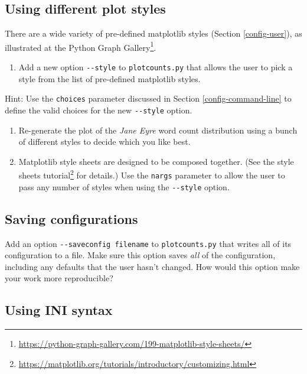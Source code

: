 \documentclass[
]{krantz}
\providecommand{\tightlist}{%
  \setlength{\itemsep}{0pt}\setlength{\parskip}{0pt}}
\renewcommand{\href}[2]{#2\footnote{\url{#1}}}
\begin{document}
\hypertarget{config-ex-style}{%
\subsection{Using different plot styles}\label{config-ex-style}}

There are a wide variety of pre-defined matplotlib styles (Section \ref{config-user}),
as illustrated at the \href{https://python-graph-gallery.com/199-matplotlib-style-sheets/}{Python Graph Gallery}.

\begin{enumerate}
\def\labelenumi{\arabic{enumi}.}
\tightlist
\item
  Add a new option \texttt{-\/-style} to \texttt{plotcounts.py} that allows the user
  to pick a style from the list of pre-defined matplotlib styles.
\end{enumerate}

Hint: Use the \texttt{choices} parameter discussed in Section \ref{config-command-line}
to define the valid choices for the new \texttt{-\/-style} option.

\begin{enumerate}
\def\labelenumi{\arabic{enumi}.}
\setcounter{enumi}{1}
\item
  Re-generate the plot of the \emph{Jane Eyre} word count distribution
  using a bunch of different styles to decide which you like best.
\item
  Matplotlib style sheets are designed to be composed together.
  (See the \href{https://matplotlib.org/tutorials/introductory/customizing.html}{style sheets tutorial} for details.)
  Use the \texttt{nargs} parameter to allow the user to pass any number of styles
  when using the \texttt{-\/-style} option.
\end{enumerate}

\hypertarget{config-ex-saveload}{%
\subsection{Saving configurations}\label{config-ex-saveload}}

Add an option \texttt{-\/-saveconfig\ filename} to \texttt{plotcounts.py}
that writes all of its configuration to a file.
Make sure this option saves \emph{all} of the configuration,
including any defaults that the user hasn't changed.
How would this option make your work more reproducible?

\hypertarget{config-ex-ini}{%
\subsection{Using INI syntax}\label{config-ex-ini}}
\end{document}
